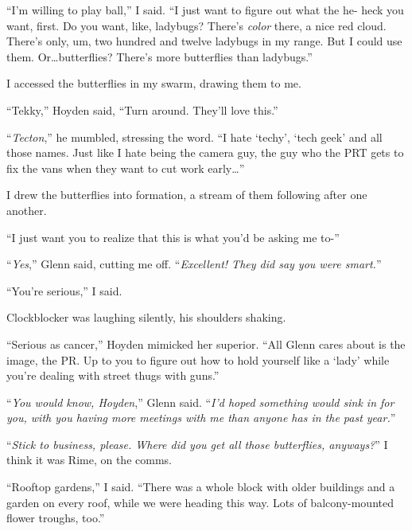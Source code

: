 ``I'm willing to play ball,'' I said.  ``I just want to figure out what the he- heck you want, first.  Do you want, like, ladybugs?  There's \emph{color} there, a nice red cloud.  There's only, um, two hundred and twelve ladybugs in my range.  But I could use them.  Or\ldots butterflies?  There's more butterflies than ladybugs.''



I accessed the butterflies in my swarm, drawing them to me.



``Tekky,'' Hoyden said, ``Turn around.  They'll love this.''



``\emph{Tecton},'' he mumbled, stressing the word.  ``I hate `techy', `tech geek' and all those names.  Just like I hate being the camera guy, the guy who the PRT gets to fix the vans when they want to cut work early\ldots''



I drew the butterflies into formation, a stream of them following after one another.



``I just want you to realize that this is what you'd be asking me to-''



``\emph{Yes},'' Glenn said, cutting me off.  ``\emph{Excellent!  They did say you were smart.}''



``You're serious,'' I said.



Clockblocker was laughing silently, his shoulders shaking.



``Serious as cancer,'' Hoyden mimicked her superior.  ``All Glenn cares about is the image, the PR.  Up to you to figure out how to hold yourself like a `lady' while you're dealing with street thugs with guns.''



``\emph{You would know, Hoyden},'' Glenn said.  ``\emph{I'd hoped something would sink in for you, with you having more meetings with me than anyone has in the past year.}''



``\emph{Stick to business, please.  Where did you get all those butterflies, anyways?}'' I think it was Rime, on the comms.



``Rooftop gardens,'' I said.  ``There was a whole block with older buildings and a garden on every roof, while we were heading this way.  Lots of balcony-mounted flower troughs, too.''



